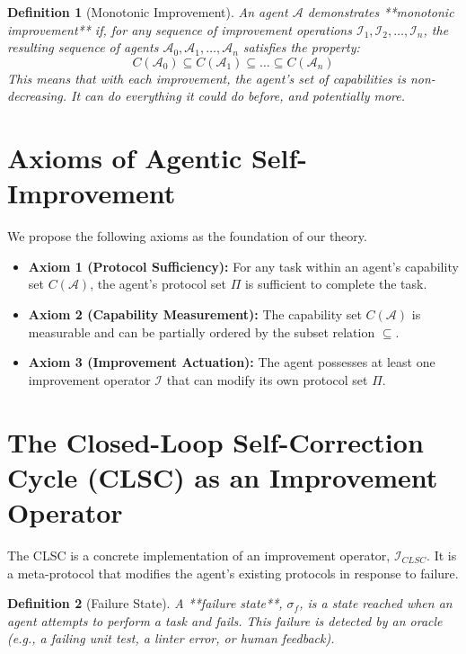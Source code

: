 \documentclass{article}
\newtheorem{definition}{Definition}
\begin{document}
\begin{definition}[Monotonic Improvement]
An agent $\mathcal{A}$ demonstrates **monotonic improvement** if, for any sequence of improvement operations $\mathcal{I}_1, \mathcal{I}_2, \dots, \mathcal{I}_n$, the resulting sequence of agents $\mathcal{A}_0, \mathcal{A}_1, \dots, \mathcal{A}_n$ satisfies the property:
$$ C(\mathcal{A}_0) \subseteq C(\mathcal{A}_1) \subseteq \dots \subseteq C(\mathcal{A}_n) $$
This means that with each improvement, the agent's set of capabilities is non-decreasing. It can do everything it could do before, and potentially more.
\end{definition}

\section{Axioms of Agentic Self-Improvement}

We propose the following axioms as the foundation of our theory.

\begin{itemize}
    \item \textbf{Axiom 1 (Protocol Sufficiency):} For any task within an agent's capability set $C(\mathcal{A})$, the agent's protocol set $\Pi$ is sufficient to complete the task.
    \item \textbf{Axiom 2 (Capability Measurement):} The capability set $C(\mathcal{A})$ is measurable and can be partially ordered by the subset relation $\subseteq$.
    \item \textbf{Axiom 3 (Improvement Actuation):} The agent possesses at least one improvement operator $\mathcal{I}$ that can modify its own protocol set $\Pi$.
\end{itemize}

\section{The Closed-Loop Self-Correction Cycle (CLSC) as an Improvement Operator}

The CLSC is a concrete implementation of an improvement operator, $\mathcal{I}_{CLSC}$. It is a meta-protocol that modifies the agent's existing protocols in response to failure.

\begin{definition}[Failure State]
A **failure state**, $\sigma_f$, is a state reached when an agent attempts to perform a task and fails. This failure is detected by an oracle (e.g., a failing unit test, a linter error, or human feedback).
\end{definition}
\end{document}
